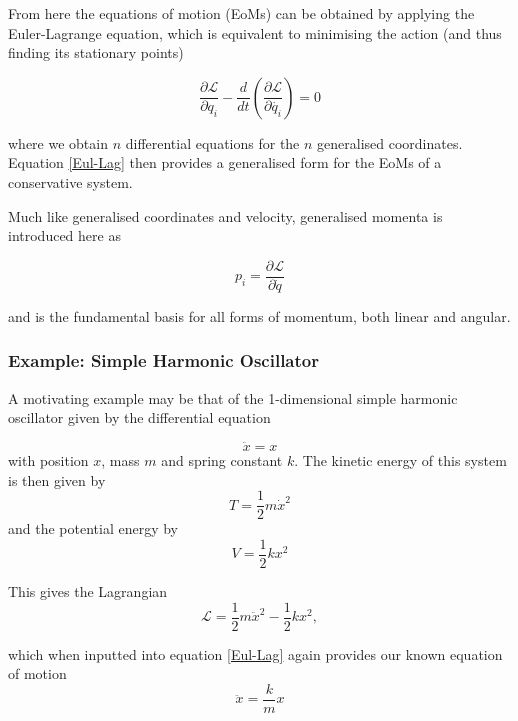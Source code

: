 \documentclass[10pt]{iopart}
\begin{document}
From here the equations of motion (EoMs) can be obtained by applying the Euler-Lagrange equation, which is equivalent to minimising the action (and thus finding its stationary points)

\begin{equation}
\label{Eul-Lag}
	\frac{\partial\mathcal{L}}{\partial q_i} - \frac{d}{dt}\left(\frac{\partial \mathcal{L}}{\partial \dot{q_i}}\right) = 0
\end{equation}

\noindent where we obtain $n$ differential equations for the $n$ generalised coordinates. Equation \ref{Eul-Lag} then provides a generalised form for the EoMs of a conservative system. 

Much like generalised coordinates and velocity, generalised momenta is introduced here as 

\begin{equation}
\label{GeneralisedMomenta}
	p_i = \frac{\partial \mathcal{L}}{\partial \dot q}
\end{equation}

and is the fundamental basis for all forms of momentum, both linear and angular.

\subsubsection{Example: Simple Harmonic Oscillator \\}

A motivating example may be that of the 1-dimensional simple harmonic oscillator given by the differential equation

\begin{equation}
	\ddot x = x
\end{equation}
with position $x$, mass $m$ and spring constant $k$. The kinetic energy of this system is then given by
\begin{equation}
	T = \frac{1}{2}m\dot x^2
\end{equation}
and the potential energy by 
\begin{equation}
	V = \frac{1}{2}kx^2
\end{equation}

\noindent This gives the Lagrangian
\begin{equation}
	\mathcal{L} = \frac{1}{2}m\ddot x^2 - \frac{1}{2}kx^2,
\end{equation}

\noindent which when inputted into equation \ref{Eul-Lag} again provides our known equation of motion
\begin{equation}
\label{HOeqn}
	\ddot x = \frac{k}{m}x
\end{equation}
\end{document}
